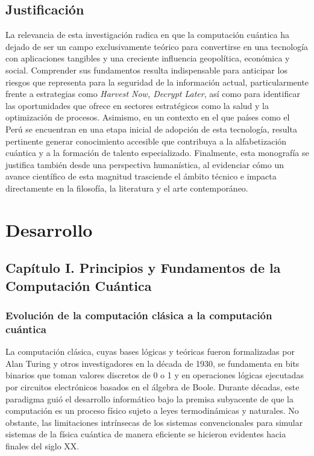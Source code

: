\documentclass[12pt,a4paper]{article}
\begin{document}
\subsection*{Justificación}
La relevancia de esta investigación radica en que la computación cuántica ha dejado de ser un campo exclusivamente teórico para convertirse en una tecnología con aplicaciones tangibles y una creciente influencia geopolítica, económica y social. Comprender sus fundamentos resulta indispensable para anticipar los riesgos que representa para la seguridad de la información actual, particularmente frente a estrategias como \textit{Harvest Now, Decrypt Later}, así como para identificar las oportunidades que ofrece en sectores estratégicos como la salud y la optimización de procesos. Asimismo, en un contexto en el que países como el Perú se encuentran en una etapa inicial de adopción de esta tecnología, resulta pertinente generar conocimiento accesible que contribuya a la alfabetización cuántica y a la formación de talento especializado. Finalmente, esta monografía se justifica también desde una perspectiva humanística, al evidenciar cómo un avance científico de esta magnitud trasciende el ámbito técnico e impacta directamente en la filosofía, la literatura y el arte contemporáneo.

\setcounter{section}{0}
\section{Desarrollo}

\subsection{Capítulo I. Principios y Fundamentos de la Computación Cuántica}

\subsubsection{Evolución de la computación clásica a la computación cuántica}
La computación clásica, cuyas bases lógicas y teóricas fueron formalizadas por Alan Turing y otros investigadores en la década de 1930, se fundamenta en bits binarios que toman valores discretos de 0 o 1 y en operaciones lógicas ejecutadas por circuitos electrónicos basados en el álgebra de Boole. 
Durante décadas, este paradigma guió el desarrollo informático bajo la premisa subyacente de que la computación es un proceso físico sujeto a leyes termodinámicas y naturales. No obstante, las limitaciones intrínsecas de los sistemas convencionales para simular sistemas de la física cuántica de manera eficiente se hicieron evidentes hacia finales del siglo XX.\\
\end{document}
